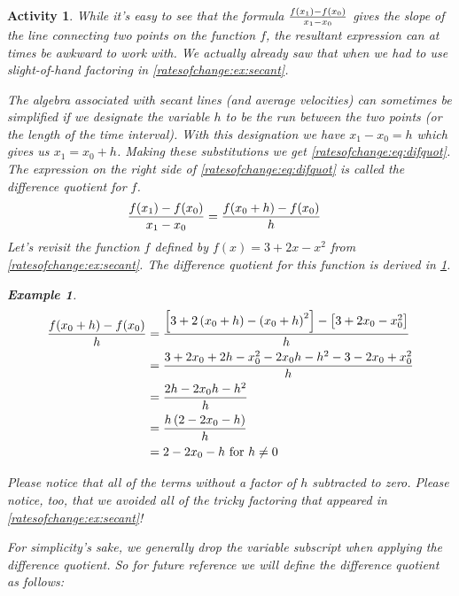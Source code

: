 \documentclass[12pt]{article}
\theoremstyle{activity}
\newtheorem{activity}{Activity}
\theoremstyle{problem}
\theoremstyle{example}
\newtheorem{example}{Example}
\theoremstyle{definition}
\theoremstyle{exercises}
\theoremstyle{exercise}
\begin{document}
\begin{activity}
While it's easy to see that the formula $\frac{f\mleft(x_1\mright)-f\mleft(x_0\mright)}{x_1-x_0}$ gives the slope of the line connecting two
points on the function $f$, the resultant expression can at times be awkward to work with. We actually already saw that when we had to use slight-of-hand factoring in \cref{ratesofchange:ex:secant}. 

The algebra associated with secant lines (and average velocities) can sometimes be simplified if we designate the variable $h$ to be the run between the two points (or the length of the time interval). With this designation we have $x_1-x_0=h$ which gives us $x_1=x_0+h$. Making these substitutions we get \cref{ratesofchange:eq:difquot}. The expression on the right side of \cref{ratesofchange:eq:difquot} is called \emph{the difference
quotient for $f$}.
\begin{align}\label{ratesofchange:eq:difquot}
\frac{f\mleft(x_1\mright)-f\mleft(x_0\mright)}{x_1-x_0}
&=\frac{f\mleft(x_0+h\mright)-f\mleft(x_0\mright)}{h}
\end{align} 
%
Let's revisit the function $f$ defined by $f(x)=3+2x-x^2$ from \cref{ratesofchange:ex:secant}. The difference quotient for this
function is derived in \cref{ratesofchange:ex:difquot}. 
\begin{example}\label{ratesofchange:ex:difquot}
\begin{align*}
\frac{f\mleft(x_0+h\mright)-f\mleft(x_0\mright)}{h}
&= \frac{\left[3+2\left(x_0+h\right)-\left(x_0+h\right)^2\right]-\left[3+2x_0-x_0^2\right]}{h}\\
&= \frac{3+2x_0+2h-x_0^2-2x_0h-h^2-3-2x_0+x_0^2}{h}\\
&= \frac{2h-2x_0h-h^2}{h}\\
&= \frac{h\left(2-2x_0-h\right)}{h}\\
&= 2-2x_0-h\text{ for }h\neq0
\end{align*}
\end{example}
Please notice that all of the terms without a factor of $h$ subtracted to zero. Please notice, too, that we avoided all of the tricky factoring that appeared in \cref{ratesofchange:ex:secant}! 

For simplicity's sake, we generally drop the variable subscript when applying the difference quotient. So for future reference we will define the difference quotient as follows: 


\end{activity}
\end{document}
